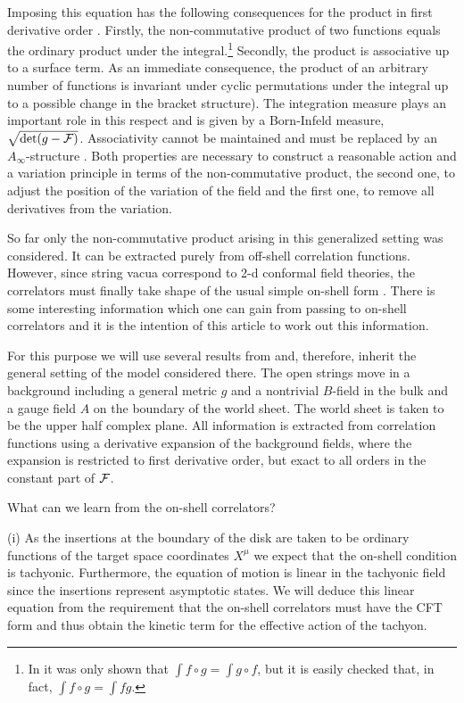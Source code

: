 \documentclass[a4paper,11pt]{article}               \def\new#1\endnew{{\bf #1}}
\newcommand {\cF} {{\cal F}}
\begin{document}
Imposing this equation has the
following consequences for the product in first derivative order 
\cite{Herbst:2001ai}.
Firstly, the non-commutative product of two functions equals the
ordinary product under the integral.\footnote{
In \cite{Herbst:2001ai} it was only shown that 
$\int f\circ g = \int g\circ f$, 
but it is easily checked that, in fact, $\int f\circ g = \int fg$.
}
Secondly, the product is associative up to a surface term.
As an immediate consequence, the product of 
an arbitrary number of functions is invariant under cyclic
permutations under the integral up to a possible change in the
bracket structure). The integration measure plays an important role 
in this respect and is given by a Born-Infeld measure, 
$\sqrt{\det(g-\cF)}$. Associativity cannot be maintained and must be 
replaced by an $A_\infty$-structure \cite{Cornalba:2002sm,stasheff}. 
Both properties are necessary to construct a reasonable action and a 
variation principle in terms of the non-commutative
product, the second one, to adjust the position of the variation of
the field and the first one, to remove all derivatives from the variation.

So far only the non-commutative product arising in this generalized setting
was considered. It can be
extracted purely from off-shell correlation functions. However, since 
string vacua correspond to 2-d 
conformal field theories, the correlators must finally take 
shape of the usual simple on-shell form \cite{Polchinski:1998rq}. 
There is some interesting information which one can gain from passing 
to on-shell correlators and it is the intention of this 
article to work out this information. 

For this purpose we will use several results from \cite{Herbst:2001ai}
and, therefore, inherit the
general setting of the model considered there. The open strings move
in a background including a general metric $g$ and a nontrivial $B$-field 
in the bulk and a gauge field $A$ on the boundary of the world sheet.
The world sheet is taken to be the upper half complex plane. All 
information is extracted from correlation functions using a derivative 
expansion of the background fields, where the expansion is restricted to 
first derivative order, but exact to all orders in the constant part of 
$\cF$.

\newpage
\noindent
What can we learn from the on-shell correlators? 

(i) As the insertions at the boundary of the disk are taken to 
be ordinary functions of the target space coordinates $X^\mu$ we
expect that the on-shell condition is tachyonic. 
Furthermore, the equation of motion is linear in the tachyonic field
since the insertions represent asymptotic states. We will deduce this
linear equation from the requirement that the on-shell correlators
must have the CFT form and thus obtain 
the kinetic term for the effective action of the tachyon. 
\end{document}
